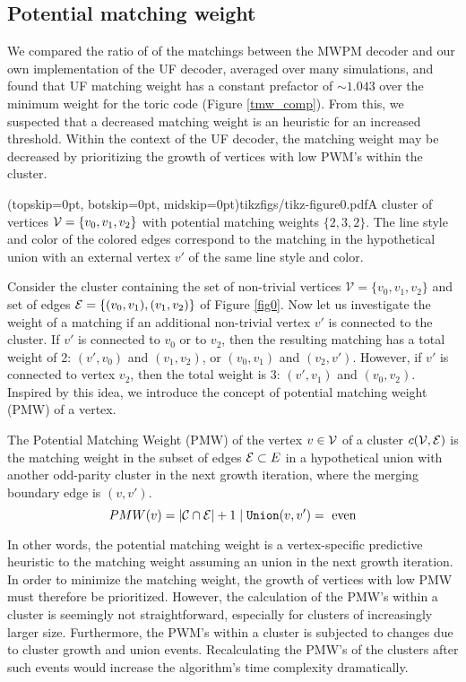 \subsection{Potential matching weight}\label{sec:matchingweight}
We compared the ratio of of the matchings between the MWPM decoder and our own implementation of the UF decoder, averaged over many simulations, and found that UF matching weight has a constant prefactor of $\sim 1.043$ over the minimum weight for the toric code (Figure \ref{tmw_comp}). From this, we suspected that a decreased matching weight is an heuristic for an increased threshold. Within the context of the UF decoder, the matching weight may be decreased by prioritizing the growth of vertices with low PWM's within the cluster. 

\Figure[htb](topskip=0pt, botskip=0pt, midskip=0pt){tikzfigs/tikz-figure0.pdf}{A cluster of vertices $\mathcal{V}=\{v_0, v_1, v_2\}$ with potential matching weights $\{2, 3, 2\}$. The line style and color of the colored edges correspond to the matching in the hypothetical union with an external vertex $v'$ of the same line style and color.\label{fig0}}

Consider the cluster containing the set of non-trivial vertices $\mathcal{V}=\{v_0,v_1,v_2\}$ and set of edges $\mathcal{E}=\{(v_0,v_1), (v_1, v_2)\}$ of Figure \ref{fig0}. Now let us investigate the weight of a matching if an additional non-trivial vertex $v'$ is connected to the cluster. If $v'$ is connected to $v_0$ or to $v_2$, then the resulting matching has a total weight of 2: $(v',v_0)$ and $(v_1,v_2)$, or $(v_0,v_1)$ and $(v_2,v')$. However, if $v'$ is connected to vertex $v_2$, then the total weight is 3: $(v', v_1)$ and $(v_0, v_2)$. Inspired by this idea, we introduce the concept of potential matching weight (PMW) of a vertex. 

\begin{definition}\label{def:pmw}
    The Potential Matching Weight (PMW) of the vertex $v\in \mathcal{V}$ of a cluster $c(\mathcal{V},\mathcal{E})$ is the matching weight in the subset of edges $\mathcal{E} \subset E$ in a hypothetical union with another odd-parity cluster in the next growth iteration, where the merging boundary edge is $(v,v')$. 
    \begin{equation}
      PMW(v) = \lvert\mathcal{C} \cap \mathcal{E}\rvert + 1 \mid \texttt{Union}(v, v') = \text{ even}
    \end{equation}
\end{definition}
In other words, the potential matching weight is a vertex-specific predictive heuristic to the matching weight assuming an union in the next growth iteration. In order to minimize the matching weight, the growth of vertices with low PMW must therefore be prioritized. However, the calculation of the PMW's within a cluster is seemingly not straightforward, especially for clusters of increasingly larger size. Furthermore, the PWM's within a cluster is subjected to changes due to cluster growth and union events. Recalculating the PMW's of the clusters after such events would increase the algorithm's time complexity dramatically. 
